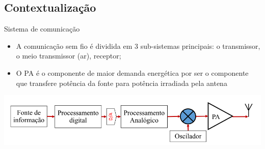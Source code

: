 \documentclass{if-beamer}
\begin{document}
\subsection{Contextualização}
\begin{frame}{Sistema de comunicação}
	\begin{itemize}
		\item A comunicação sem fio é dividida em 3 sub-sistemas principais:	o transmissor, o meio transmissor (ar), receptor;
		\item O PA é o componente de maior demanda energética por ser o componente que transfere potência da fonte para potência irradiada pela antena
	\end{itemize}
	\includegraphics[scale=0.5]{sistematrasmissorpng.png}
\end{frame}

\end{document}
